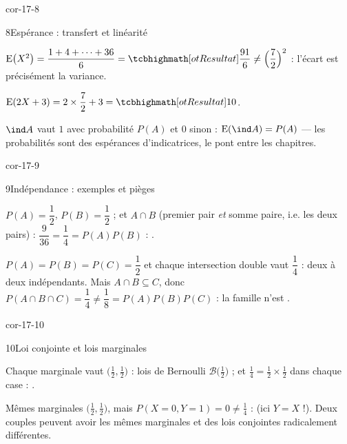 \begin{blocLivre}{cor-17-8}
\begin{corrige}{8}{Espérance : transfert et linéarité}
\begin{questions}
  \item $\mathrm{E}\bigl(X^{2}\bigr)=\dfrac{1+4+\dots+36}{6}
    =\res{\dfrac{91}{6}}\neq\Bigl(\dfrac72\Bigr)^{2}$ : l'écart est
    précisément la variance.
  \item $\mathrm{E}(2X+3)=2\times\dfrac72+3=\res{10}$.
  \item $\ind A$ vaut $1$ avec probabilité $P(A)$ et $0$ sinon :
    $\mathrm{E}(\ind A)=P(A)$ — les probabilités sont des espérances
    d'indicatrices, le pont entre les chapitres.
\end{questions}
\end{corrige}
\end{blocLivre}

\begin{blocLivre}{cor-17-9}
\begin{corrige}{9}{Indépendance : exemples et pièges}
\begin{questions}
  \item $P(A)=\dfrac12$, $P(B)=\dfrac12$ ; et $A\cap B$ (premier pair
    \emph{et} somme paire, i.e. les deux pairs) : $\dfrac{9}{36}=\dfrac14
    =P(A)P(B)$ : .
  \item $P(A)=P(B)=P(C)=\dfrac12$ et chaque intersection double vaut
    $\dfrac14$ : deux à deux indépendants. Mais
    $A\cap B\subseteq C$, donc
    $P(A\cap B\cap C)=\dfrac14\neq\dfrac18=P(A)P(B)P(C)$ : la famille
    n'est .
\end{questions}
\end{corrige}
\end{blocLivre}

\begin{blocLivre}{cor-17-10}
\begin{corrige}{10}{Loi conjointe et lois marginales}
\begin{questions}
  \item Chaque marginale vaut $\bigl(\frac12,\frac12\bigr)$ : lois de
    Bernoulli $\mathcal{B}\bigl(\frac12\bigr)$ ; et
    $\frac14=\frac12\times\frac12$ dans chaque case :
    .
  \item Mêmes marginales $\bigl(\frac12,\frac12\bigr)$, mais
    $P(X=0,Y=1)=0\neq\frac14$ :  (ici $Y=X$ !).
    Deux couples peuvent avoir les mêmes marginales et des lois conjointes
    radicalement différentes.
\end{questions}
\end{corrige}
\end{blocLivre}

